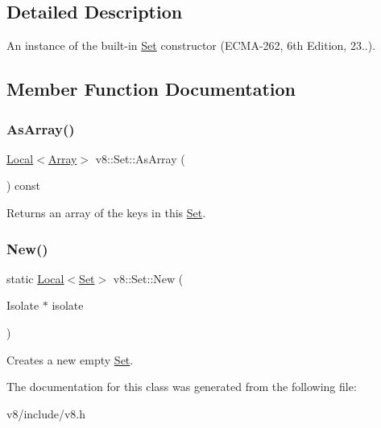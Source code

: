 \subsection{Detailed Description}
An instance of the built-\/in \mbox{\hyperlink{classv8_1_1Set}{Set}} constructor (E\+C\+M\+A-\/262, 6th Edition, 23..). 

\subsection{Member Function Documentation}
\mbox{\label{classv8_1_1Set_aa4e8576e0a657bcd61364f3bc26e2b56}} 
\subsubsection{\texorpdfstring{As\+Array()}{AsArray()}}
{\footnotesize\ttfamily \mbox{\hyperlink{classv8_1_1Local}{Local}}$<$\mbox{\hyperlink{classv8_1_1Array}{Array}}$>$ v8\+::\+Set\+::\+As\+Array (\begin{DoxyParamCaption}{ }\end{DoxyParamCaption}) const}

Returns an array of the keys in this \mbox{\hyperlink{classv8_1_1Set}{Set}}. \mbox{\label{classv8_1_1Set_a036e773566a36997a79e78ef0a4103a1}} 
\subsubsection{\texorpdfstring{New()}{New()}}
{\footnotesize\ttfamily static \mbox{\hyperlink{classv8_1_1Local}{Local}}$<$\mbox{\hyperlink{classv8_1_1Set}{Set}}$>$ v8\+::\+Set\+::\+New (\begin{DoxyParamCaption}\item[{Isolate $\ast$}]{isolate }\end{DoxyParamCaption})\hspace{0.3cm}{\ttfamily [static]}}

Creates a new empty \mbox{\hyperlink{classv8_1_1Set}{Set}}. 

The documentation for this class was generated from the following file\+:\begin{DoxyCompactItemize}
\item 
v8/include/v8.\+h\end{DoxyCompactItemize}
